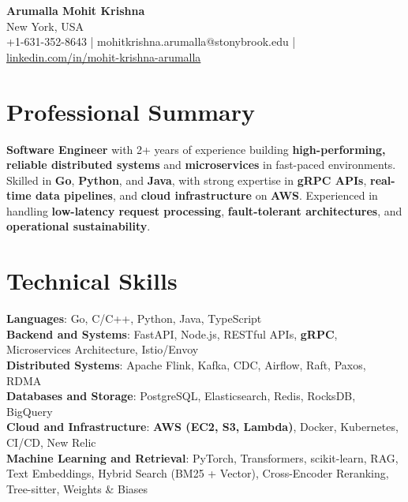 \documentclass[letterpaper,11pt]{article}
\begin{document}
\begin{center}
  {\Large \textbf{Arumalla Mohit Krishna}} \\
  New York, USA \\
  +1-631-352-8643 \enspace | \enspace mohitkrishna.arumalla@stonybrook.edu \enspace | \enspace \href{https://www.linkedin.com/in/mohit-krishna-arumalla}{linkedin.com/in/mohit-krishna-arumalla}
\end{center}

\section{Professional Summary}
  \begin{itemize}[leftmargin=0.15in, label={}]
    \small{\item{
     \textbf{Software Engineer} with 2+ years of experience building \textbf{high-performing, reliable distributed systems} and \textbf{microservices} in fast-paced environments. Skilled in \textbf{Go}, \textbf{Python}, and \textbf{Java}, with strong expertise in \textbf{gRPC APIs}, \textbf{real-time data pipelines}, and \textbf{cloud infrastructure} on \textbf{AWS}. Experienced in handling \textbf{low-latency request processing}, \textbf{fault-tolerant architectures}, and \textbf{operational sustainability}.
    }}
  \end{itemize}
\vspace{-16pt}

\section{Technical Skills}
 \begin{itemize}[leftmargin=0.15in, label={}]
    \small{\item{
     \textbf{Languages}: Go, C/C++, Python, Java, TypeScript \\
     \textbf{Backend and Systems}: FastAPI, Node.js, RESTful APIs, \textbf{gRPC}, Microservices Architecture, Istio/Envoy \\
     \textbf{Distributed Systems}: Apache Flink, Kafka, CDC, Airflow, Raft, Paxos, RDMA \\
     \textbf{Databases and Storage}: PostgreSQL, Elasticsearch, Redis, RocksDB, BigQuery \\
     \textbf{Cloud and Infrastructure}: \textbf{AWS (EC2, S3, Lambda)}, Docker, Kubernetes, CI/CD, New Relic \\
     \textbf{Machine Learning and Retrieval}: PyTorch, Transformers, scikit-learn, RAG, Text Embeddings, Hybrid Search (BM25 + Vector), Cross-Encoder Reranking, Tree-sitter, Weights \& Biases
    }}
 \end{itemize}
\vspace{-16pt}
\end{document}
